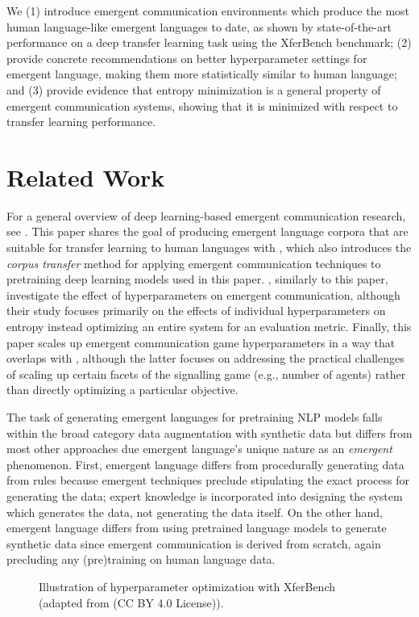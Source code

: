 We (1) introduce emergent communication environments which produce the most human language-like emergent languages to date, as shown by state-of-the-art performance on a deep transfer learning task using the XferBench benchmark;
(2) provide concrete recommendations on better hyperparameter settings for emergent language, making them more statistically similar to human language; and
(3) provide evidence that entropy minimization is a general property of emergent communication systems, showing that it is minimized with respect to transfer learning performance.


\section{Related Work}
\unskip\label{hpo:sec:related-work}
For a general overview of deep learning-based emergent communication research, see \citet{lazaridou2020review}.
This paper shares the goal of producing emergent language corpora that are suitable for transfer learning to human languages with \citet{yao2022linking}, which also introduces the \emph{corpus transfer} method for applying emergent communication techniques to pretraining deep learning models used in this paper.
\citet{boldt2023mathmodel}, similarly to this paper, investigate the effect of hyperparameters on emergent communication, although their study focuses primarily on the effects of individual hyperparameters on entropy instead optimizing an entire system for an evaluation metric.
Finally, this paper scales up emergent communication game hyperparameters in a way that overlaps with \citet{chaabouni2022emergent}, although the latter focuses on addressing the practical challenges of scaling up certain facets of the signalling game (e.g., number of agents) rather than directly optimizing a particular objective.

The task of generating emergent languages for pretraining NLP models falls within the broad category data augmentation with synthetic data  but differs from most other approaches due emergent language's unique nature as an \emph{emergent} phenomenon.
First, emergent language differs from procedurally generating data from rules because emergent techniques preclude stipulating the exact process for generating the data; expert knowledge is incorporated into designing the system which generates the data, not generating the data itself.
On the other hand, emergent language differs from using pretrained language models to generate synthetic data since emergent communication is derived from scratch, again precluding any (pre)training on human language data.

\begin{figure*}
  \centering
  \caption{Illustration of hyperparameter optimization with XferBench (adapted from \citet{xferbench} (CC BY 4.0 License)).}
  \unskip\label{hpo:fig:xb}
\end{figure*}

